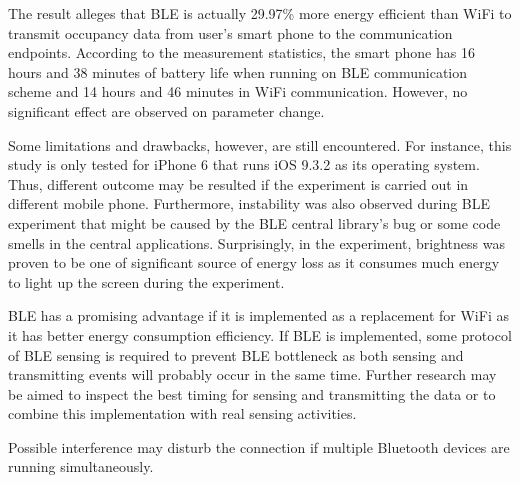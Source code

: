 \documentclass[journal]{vgtc}                %
\begin{document}
The result alleges that BLE is actually 29.97\% more energy efficient than WiFi to transmit occupancy data from user's smart phone to the communication endpoints. According to the measurement statistics, the smart phone has 16 hours and 38 minutes of battery life when running on BLE communication scheme and 14 hours and 46 minutes in WiFi communication. However, no significant effect are observed on parameter change.

Some limitations and drawbacks, however, are still encountered. For instance, this study is only tested for iPhone 6 that runs iOS 9.3.2 as its operating system. Thus, different outcome may be resulted if the experiment is carried out in different mobile phone. Furthermore, instability was also observed during BLE experiment that might be caused by the BLE central library's bug or some code smells in the central applications. Surprisingly, in the experiment, brightness was proven to be one of significant source of energy loss as it consumes much energy to light up the screen during the experiment.

BLE has a promising advantage if it is implemented as a replacement for WiFi as it has better energy consumption efficiency. If BLE is implemented, some protocol of BLE sensing is required to prevent BLE bottleneck as both sensing and transmitting events will probably occur in the same time. Further research may be aimed to inspect the best timing for sensing and transmitting the data or to combine this implementation with real sensing activities.

Possible interference may disturb the connection if multiple Bluetooth devices are running simultaneously\cite{Conte2014}.






\end{document}
